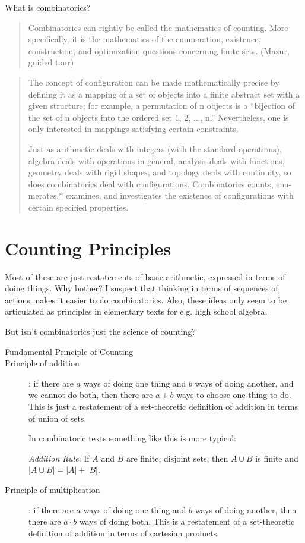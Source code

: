What is combinatorics?

\blockquote{Combinatorics can rightly be called the mathematics of counting. More speciﬁcally, it
is the mathematics of the enumeration, existence, construction, and optimization questions
concerning ﬁnite sets. (Mazur, guided tour)}

\blockquote{The concept of configuration can be made mathematically precise by defining it as a mapping of a set of objects into a finite abstract set with a given structure; for example, a permutation of n objects is a “bijection of the set of n objects into the ordered set 1, 2, ..., n.” Nevertheless, one is only interested in mappings satisfying certain constraints.

Just as arithmetic deals with integers (with the standard operations), algebra deals with operations in general, analysis deals with functions, geometry deals with rigid shapes, and topology deals with continuity, so does combinatorics deal with configurations. Combinatorics counts, enu- merates,* examines, and investigates the existence of configurations with certain specified properties.
}

\section{Counting Principles}

\begin{remark}
  Most of these are just restatements of basic arithmetic, expressed
  in terms of doing things.  Why bother?  I suspect that thinking in
  terms of sequences of actions makes it easier to do combinatorics.
  Also, these ideas only seem to be articulated as principles in
  elementary texts for e.g. high school algebra.
\end{remark}

\begin{remark}
  But isn't combinatorics just the science of counting?
\end{remark}


\begin{description}
\item [Fundamental Principle of Counting]

\item [Principle of addition]: if there are $a$ ways of doing one thing
  and $b$ ways of doing another, and we cannot do both, then there are
  $a+b$ ways to choose one thing to do.  This is just a restatement of
  a set-theoretic definition of addition in terms of union of sets.

  In combinatoric texts something like this is more typical:

  \textit{Addition Rule}. If $A$ and $B$ are finite, disjoint sets,
  then $A \cup B$ is finite and $|A \cup B| = |A| + |B|$.

\item [Principle of multiplication]: if there are $a$ ways of doing
  one thing and $b$ ways of doing another, then there are $a\cdot b$
  ways of doing both.  This is a restatement of a set-theoretic
  definition of addition in terms of cartesian products.
\end{description}


